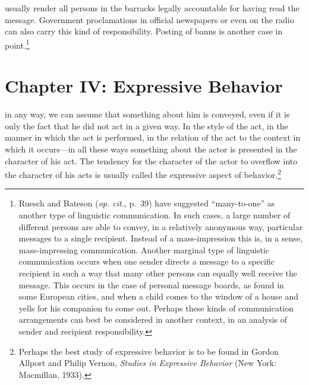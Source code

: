 \documentclass[openany,nobib]{tufte-book}
\let\oldchapter\chapter
\def\chapter{%
  \setcounter{footnote}{0}%
  \oldchapter
}
\begin{document}
usually render all persons in the barracks legally accountable for
having read the message. Government proclamations in official newspapers
or even on the radio can also carry this kind of responsibility. Posting
of banns is another case in point.\footnote{Ruesch and Bateson
  (\emph{op. cit.}, p.~39) have suggested ``many-to-one'' as another
  type of linguistic communication. In such cases, a large number of
  different persons are able to convey, in a relatively anonymous way,
  particular messages to a single recipient. Instead of a
  mass-impression this is, in a sense, mass-impressing communication.
  Another marginal type of linguistic communication occurs when one
  sender directs a message to a specific recipient in such a way that
  many other persons can equally well receive the message. This occurs
  in the case of personal message boards, as found in some European
  cities, and when a child comes to the window of a house and yells for
  his companion to come out. Perhaps these kinds of communication
  arrangements can best be considered in another context, in an analysis
  of sender and recipient responsibility.}


\chapter[CHAPTER IV: EXPRESSIVE BEHAVIOR]{Chapter IV: Expressive Behavior}
\label{ch:Chapter IV: Expressive Behavior}

in any way, we can assume that something
about him is conveyed, even if it is only the fact that he did not act
in a given way. In the style of the act, in the manner in which the act
is performed, in the relation of the act to the context in which it
occurs---in all these ways something about the actor is presented in the
character of his act. The tendency for the character of the actor to
overflow into the character of his acts is usually called the expressive
aspect of behavior.\footnote{Perhaps the best study of expressive
  behavior is to be found in Gordon Allport and Philip Vernon,
  \emph{Studies in Expressive Behavior} (New York: Macmillan, 1933).}
\end{document}
